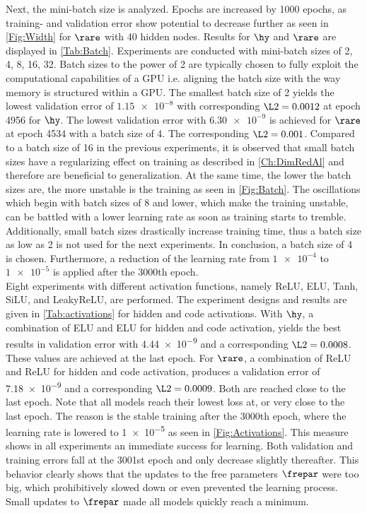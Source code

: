 Next, the mini-batch size is analyzed. Epochs are increased by 1000 epochs, as training- and validation error show potential to decrease further as seen in \cref{Fig:Width} for \(\rare\) with 40 hidden nodes. Results for $\hy$  and  $\rare$ are displayed in \cref{Tab:Batch}. Experiments are conducted with mini-batch sizes of 2, 4, 8, 16, 32. Batch sizes to the power of 2 are typically chosen to fully exploit the computational capabilities of a GPU i.e. aligning the batch size with the way memory is structured within a GPU. The smallest batch size of 2 yields the lowest validation error of \(\num{1.15e-8}\) with corresponding \(\L2 = 0.0012\) at epoch 4956 for \(\hy\). The lowest validation error with \(\num{6.30e-9}\) is achieved for \(\rare\) at epoch 4534 with a batch size of 4. The corresponding \(\L2 = 0.001\). Compared to a batch size of 16 in the previous experiments, it is observed that small batch sizes have a regularizing effect on training as described in \cref{Ch:DimRedAl} and therefore are beneficial to generalization. At the same time, the lower the batch sizes are, the more unstable is the training as seen in \cref{Fig:Batch}. The oscillations which begin with batch sizes of 8 and lower, which make the training unstable, can be battled with a lower learning rate as soon as training starts to tremble. Additionally, small batch sizes drastically increase training time, thus a batch size as low as 2 is not used for the next experiments. In conclusion, a batch size of 4 is chosen. Furthermore, a reduction of the learning rate from \(\num{1e-4}\) to \(\num{1e-5}\) is applied after the 3000th epoch.\\

Eight experiments with different activation functions, namely ReLU, ELU, Tanh, SiLU, and LeakyReLU, are performed. The experiment designs and results are given in \cref{Tab:activations} for hidden and code activations. With \(\hy\), a combination of ELU and ELU for hidden and code activation, yields the best results in validation error with \num{4.44e-9} and a corresponding \(\L2 = 0.0008\). These values are achieved at the last epoch. For \(\rare\), a combination of ReLU and ReLU for hidden and code activation, produces a validation error of \num{7.18e-9} and a corresponding \(\L2 = 0.0009\). Both are reached close to the last epoch. Note that all models reach their lowest loss at, or very close to the last epoch. The reason is the stable training after the 3000th epoch, where the learning rate is lowered to \num{1e-5} as seen in \cref{Fig:Activations}. This measure shows in all experiments an immediate success for learning. Both validation and training errors fall at the 3001st epoch and only decrease slightly thereafter. This behavior clearly shows that the updates to the free parameters \(\frepar\) were too big, which prohibitively slowed down or even prevented the learning process. Small updates to \(\frepar\) made all models quickly reach a minimum.\\

